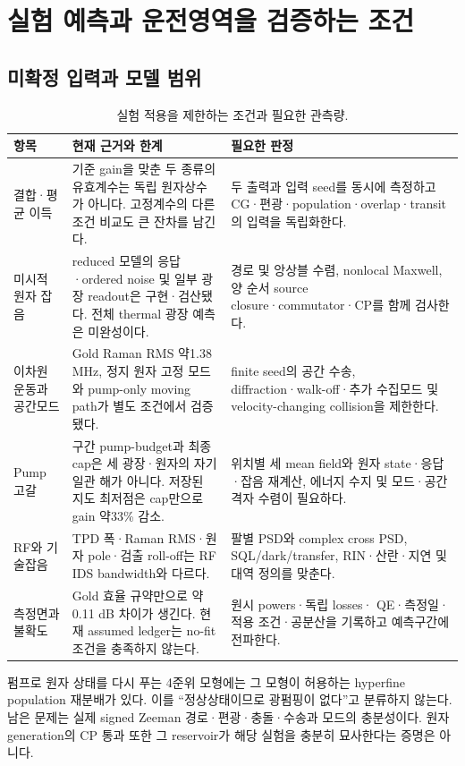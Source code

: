 \documentclass[11pt,a4paper]{article}
\begin{document}
\section{실험 예측과 운전영역을 검증하는 조건}
\subsection{미확정 입력과 모델 범위}
\begin{table}[htbp]\centering\small
\caption{실험 적용을 제한하는 조건과 필요한 관측량.}\label{tab:limits}
\begin{tabularx}{\linewidth}{P{3.0cm}Y Y}
\toprule 항목 & 현재 근거와 한계 & 필요한 판정\\\midrule
결합·평균 이득 & 기준 gain을 맞춘 두 종류의 유효계수는 독립 원자상수가 아니다.
고정계수의 다른 조건 비교도 큰 잔차를 남긴다. & 두 출력과 입력 seed를
동시에 측정하고 CG·편광·population·overlap·transit의 입력을 독립화한다.\\
미시적 원자 잡음 & reduced 모델의 응답·ordered noise 및 일부 광장 readout은
구현·검산됐다. 전체 thermal 광장 예측은 미완성이다. & 경로 및 앙상블 수렴,
nonlocal Maxwell, 양 순서 source closure·commutator·CP를 함께 검사한다.\\
이차원 운동과 공간모드 & Gold Raman RMS 약1.38 MHz, 정지 원자 고정 모드와
pump-only moving path가 별도 조건에서 검증됐다. & finite seed의 공간 수송,
diffraction·walk-off·추가 수집모드 및 velocity-changing collision을 제한한다.\\
Pump 고갈 & 구간 pump-budget과 최종 cap은 세 광장·원자의 자기일관 해가 아니다.
저장된 지도 최저점은 cap만으로 gain 약33\% 감소. & 위치별 세 mean field와
원자 state·응답·잡음 재계산, 에너지 수지 및 모드·공간격자 수렴이 필요하다.\\
RF와 기술잡음 & TPD 폭·Raman RMS·원자 pole·검출 roll-off는 RF IDS bandwidth와 다르다. &
팔별 PSD와 complex cross PSD, SQL/dark/transfer, RIN·산란·지연 및 대역 정의를 맞춘다.\\
측정면과 불확도 & Gold 효율 규약만으로 약0.11 dB 차이가 생긴다.
현재 assumed ledger는 no-fit 조건을 충족하지 않는다. & 원시 powers·독립 losses·
QE·측정일·적용 조건·공분산을 기록하고 예측구간에 전파한다.\\
\bottomrule
\end{tabularx}
\end{table}
펌프로 원자 상태를 다시 푸는 4준위 모형에는 그 모형이 허용하는
hyperfine population 재분배가 있다. 이를 ``정상상태이므로 광펌핑이 없다''고
분류하지 않는다. 남은 문제는 실제 signed Zeeman 경로·편광·충돌·수송과
모드의 충분성이다. 원자 generation의 CP 통과 또한 그 reservoir가
해당 실험을 충분히 묘사한다는 증명은 아니다.
\end{document}
